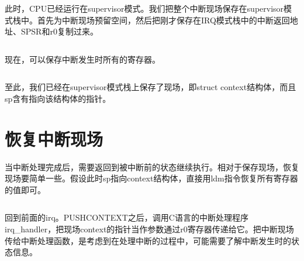 \documentclass[main.tex]{subfiles}
\begin{document}
\begin{CJK*}{UTF8}{song}
\begin{code}
\label{code:3-10}
\inputminted[firstline=47,lastline=50,linenos,numbersep=5pt,frame=lines,framesep=2mm]{gas}{src/chapter03/kernel/entry.S}
\end{code}

此时，CPU已经运行在supervisor模式。我们把整个中断现场保存在supervisor模式栈中。首先为中断现场预留空间，然后把刚才保存在IRQ模式栈中的中断返回地址、SPSR和r0复制过来。

\begin{code}
\label{code:3-11}
\inputminted[firstline=51,lastline=57,linenos,numbersep=5pt,frame=lines,framesep=2mm]{gas}{src/chapter03/kernel/entry.S}
\end{code}

现在，可以保存中断发生时所有的寄存器。
\begin{code}
\label{code:3-12}
\inputminted[firstline=58,lastline=61,linenos,numbersep=5pt,frame=lines,framesep=2mm]{gas}{src/chapter03/kernel/entry.S}
\end{code}
至此，我们已经在supervisor模式栈上保存了现场，即struct context结构体，而且sp含有指向该结构体的指针。

\section{恢复中断现场}
当中断处理完成后，需要返回到被中断前的状态继续执行。相对于保存现场，恢复现场要简单一些。假设此时sp指向context结构体，直接用ldm指令恢复所有寄存器的值即可。

\begin{code}
\label{code:3-13}
\inputminted[firstline=63,lastline=69,linenos,numbersep=5pt,frame=lines,framesep=2mm]{gas}{src/chapter03/kernel/entry.S}
\end{code}

回到前面的irq。PUSHCONTEXT之后，调用C语言的中断处理程序irq\_handler，把现场context的指针当作参数通过r0寄存器传递给它。把中断现场传给中断处理函数，是考虑到在处理中断的过程中，可能需要了解中断发生时的状态信息。

\begin{code}
\label{code:3-14}
\inputminted[firstline=145,lastline=151,linenos,numbersep=5pt,frame=lines,framesep=2mm]{gas}{src/chapter03/kernel/entry.S}
\end{code}


\end{CJK*}
\end{document}
